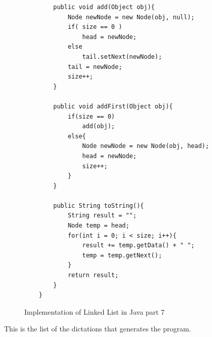 \begin{figure}[H]
	\begin{lstlisting}
	    public void add(Object obj){
	        Node newNode = new Node(obj, null);
	        if( size == 0 )
	            head = newNode;
	        else
	            tail.setNext(newNode);
	        tail = newNode;
	        size++;
	    }
	    
	    public void addFirst(Object obj){
	        if(size == 0)
	            add(obj);
	        else{
	            Node newNode = new Node(obj, head);
	            head = newNode;
	            size++;
	        }
	    }
	    
	    public String toString(){
	        String result = "";
	        Node temp = head;
	        for(int i = 0; i < size; i++){
	            result += temp.getData() + " ";
	            temp = temp.getNext();
	        }
	        return result;
	    }
	}
	\end{lstlisting}
	\caption{Implementation of Linked List in Java part 7}
	\label{fig29}
\end{figure}
This is the list of the dictations that generates the program.
